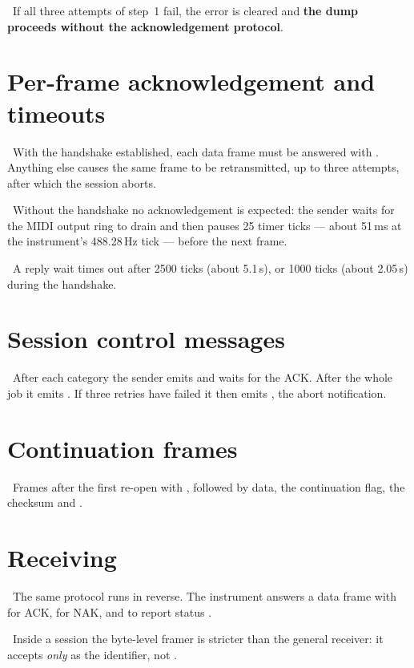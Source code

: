 \estab\ If all three attempts of step~1 fail, the error is cleared and \textbf{the dump
proceeds without the acknowledgement protocol}.

\section{Per-frame acknowledgement and timeouts}
\estab\ With the handshake established, each data frame must be answered with
. Anything else causes the same frame to be retransmitted, up to
three attempts, after which the session aborts.

\estab\ Without the handshake no acknowledgement is expected: the sender waits for the
MIDI output ring to drain and then pauses 25 timer ticks --- about 51\,ms at the
instrument's 488.28\,Hz tick --- before the next frame.

\estab\ A reply wait times out after 2500 ticks (about 5.1\,s), or 1000 ticks (about
2.05\,s) during the handshake.

\section{Session control messages}
\estab\ After each category the sender emits  and waits for the ACK.
After the whole job it emits . If three retries have failed it then
emits , the abort notification.

\section{Continuation frames}
\estab\ Frames after the first re-open with , followed by data, the
continuation flag, the checksum and .

\section{Receiving}
\estab\ The same protocol runs in reverse. The instrument answers a data frame with
 for ACK,  for NAK, and
 to report status .

\estab\ Inside a session the byte-level framer is stricter than the general receiver: it
accepts \emph{only}  as the identifier, not .
